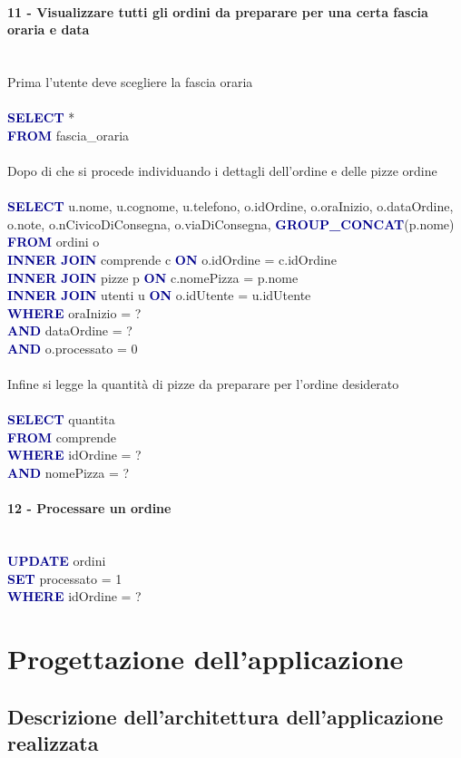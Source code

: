 \documentclass[a4paper,12pt, oneside]{article}
\begin{document}
\paragraph{11 - Visualizzare tutti gli ordini da preparare per una certa fascia oraria e data}
\hphantom{A}\\    %
Prima l'utente deve scegliere la fascia oraria
\\\\
\textcolor{darkBlue}{\textbf{SELECT}} *
\\\textcolor{darkBlue}{\textbf{FROM}} fascia\_oraria
\\\\
Dopo di che si procede individuando i dettagli dell'ordine e delle pizze ordine
\\\\
\textcolor{darkBlue}{\textbf{SELECT}} u.nome, u.cognome, u.telefono, o.idOrdine, o.oraInizio, o.dataOrdine, o.note, o.nCivicoDiConsegna, o.viaDiConsegna, \textcolor{darkBlue}{\textbf{GROUP\_CONCAT}}(p.nome)
\\\textcolor{darkBlue}{\textbf{FROM}} ordini o
\\\textcolor{darkBlue}{\textbf{INNER JOIN}} comprende c \textcolor{darkBlue}{\textbf{ON}} o.idOrdine = c.idOrdine
\\\textcolor{darkBlue}{\textbf{INNER JOIN}} pizze p \textcolor{darkBlue}{\textbf{ON}} c.nomePizza = p.nome
\\\textcolor{darkBlue}{\textbf{INNER JOIN}} utenti u \textcolor{darkBlue}{\textbf{ON}} o.idUtente = u.idUtente
\\\textcolor{darkBlue}{\textbf{WHERE}} oraInizio = ?
\\\textcolor{darkBlue}{\textbf{AND}} dataOrdine = ?
\\\textcolor{darkBlue}{\textbf{AND}} o.processato = 0
\\\\
Infine si legge la quantità di pizze da preparare per l'ordine desiderato
\\\\
\textcolor{darkBlue}{\textbf{SELECT}} quantita
\\\textcolor{darkBlue}{\textbf{FROM}} comprende
\\\textcolor{darkBlue}{\textbf{WHERE}} idOrdine = ?
\\\textcolor{darkBlue}{\textbf{AND}} nomePizza = ?

\paragraph{12 - Processare un ordine}
\hphantom{A}\\    %
\textcolor{darkBlue}{\textbf{UPDATE}} ordini
\\\textcolor{darkBlue}{\textbf{SET}} processato = 1
\\\textcolor{darkBlue}{\textbf{WHERE}} idOrdine = ?

\newpage
\section{Progettazione dell'applicazione}
\subsection{Descrizione dell'architettura dell'applicazione realizzata}
\end{document}

